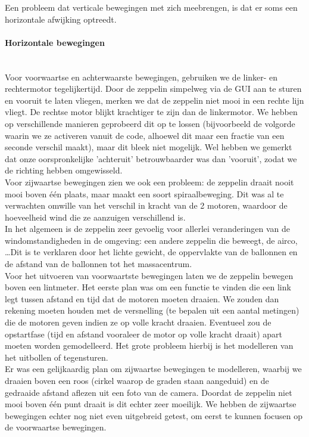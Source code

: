 \documentclass[eind]{penoverslag}
\begin{document}
Een probleem dat verticale bewegingen met zich meebrengen, is dat er soms een horizontale afwijking optreedt.

\paragraph{Horizontale bewegingen} ~\\ 
Voor voorwaartse en achterwaarste bewegingen, gebruiken we de linker- en rechtermotor tegelijkertijd. Door de zeppelin simpelweg via de GUI aan te sturen en vooruit te laten vliegen, merken we dat de zeppelin niet mooi in een rechte lijn vliegt. De rechtse motor blijkt krachtiger te zijn dan de linkermotor. We hebben op verschillende manieren geprobeerd dit op te lossen (bijvoorbeeld de volgorde waarin we ze activeren vanuit de code, alhoewel dit maar een fractie van een seconde verschil maakt), maar dit bleek niet mogelijk. Wel hebben we gemerkt dat onze oorspronkelijke 'achteruit' betrouwbaarder was dan 'vooruit', zodat we de richting hebben omgewisseld. \\

Voor zijwaartse bewegingen zien we ook een probleem: de zeppelin draait nooit mooi boven \'e\'en plaats, maar maakt een soort spiraalbeweging. Dit was al te verwachten omwille van het verschil in kracht van de 2 motoren, waardoor de hoeveelheid wind die ze aanzuigen verschillend is. \\

In het algemeen is de zeppelin zeer gevoelig voor allerlei veranderingen van de windomstandigheden in de omgeving: een andere zeppelin die beweegt, de airco, \ldots Dit is te verklaren door het lichte gewicht, de oppervlakte van de ballonnen en de afstand van de ballonnen tot het massacentrum. \\

Voor het uitvoeren van voorwaartste bewegingen laten we de zeppelin bewegen boven een lintmeter. Het eerste plan was om een functie te vinden die een link legt tussen afstand en tijd dat de motoren moeten draaien. We zouden dan rekening moeten houden met de versnelling (te bepalen uit een aantal metingen) die de motoren geven indien ze op volle kracht draaien. Eventueel zou de opstartfase (tijd en afstand vooraleer de motor op volle kracht draait) apart moeten worden gemodelleerd. Het grote probleem hierbij is het modelleren van het uitbollen of tegensturen. \\

Er was een gelijkaardig plan om zijwaartse bewegingen te modelleren, waarbij we draaien boven een roos (cirkel waarop de graden staan aangeduid) en de gedraaide afstand aflezen uit een foto van de camera. Doordat de zeppelin niet mooi boven \'e\'en punt draait is dit echter zeer moeilijk. We hebben de zijwaartse bewegingen echter nog niet even uitgebreid getest, om eerst te kunnen focusen op de voorwaartse bewegingen.
\end{document}
